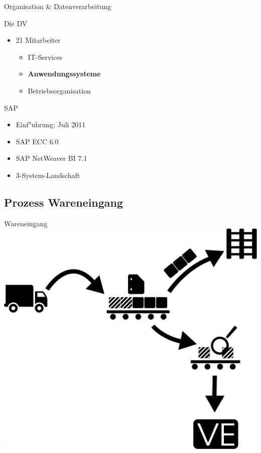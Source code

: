 \begin{frame}[<+->]{Organisation \& Datenverarbeitung}
			\begin{block}{Die DV}
				\begin{itemize}
						\item 21 Mitarbeiter
						\begin{itemize}
							\item IT-Services
							\item \textbf<6>{Anwendungssysteme}
							\item Betriebsorganisation
						\end{itemize}
				\end{itemize}
			\end{block}
			\pause
			\begin{block}{SAP}
				\begin{itemize}[<+->]
						\item Einf"uhrung: Juli 2011
						\item SAP ECC 6.0
						\item SAP NetWeaver BI 7.1
						\item 3-System-Landschaft
				\end{itemize}
			\end{block}
\end{frame}

\subsection{Prozess Wareneingang}
\begin{frame}{Wareneingang}
 \includegraphics[width=.9\textwidth]{Wareneingang2}
\end{frame}

